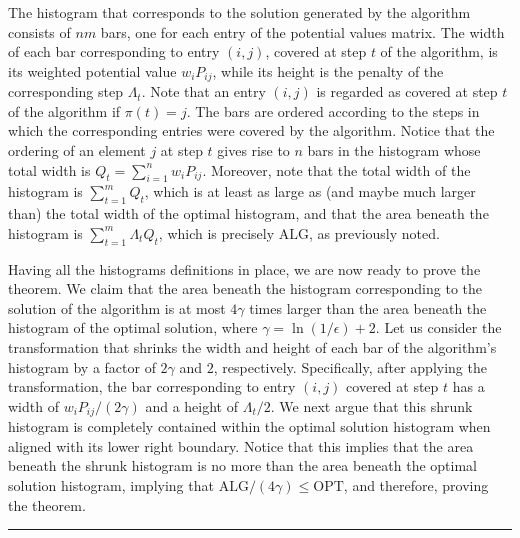 \documentclass[11pt]{article}
\theoremstyle{plain}
\theoremstyle{definition}
\newcommand{\qedsymb}{\hfill{\rule{2mm}{2mm}}}
\renewenvironment{proof}{\begin{trivlist} \item[\hspace{\labelsep}{\bf \noindent Proof.\/}] }{\qedsymb\end{trivlist}}\newenvironment{proofof}[1]{\begin{trivlist} \item[\hspace{\labelsep}{\bf \noindent Proof of #1.\/}] }{\qedsymb\end{trivlist}}\newenvironment{MyEqn}[1]{\setlength\arraycolsep{2pt}\begin{eqnarray*} #1}{\end{eqnarray*}}
\newcommand{\opt}{\mathrm{OPT}}
\newcommand{\alg}{\mathrm{ALG}}
\begin{document}
\begin{proof}
 The
histogram that corresponds to the solution generated by the
algorithm consists of $nm$ bars, one for each entry of the
potential values matrix. The width of each bar corresponding to
entry $(i,j)$, covered at step $t$ of the algorithm, is its
weighted potential value $w_i P_{ij}$, while its height is the
penalty of the corresponding step $\Lambda_{t}$. Note that an
entry $(i,j)$ is regarded as covered at step $t$ of the algorithm
if $\pi(t) = j$. The bars are ordered according to the steps in
which the corresponding entries were covered by the algorithm.
Notice that the ordering of an element $j$ at step $t$ gives rise
to $n$ bars in the histogram whose total width is $Q_t =
\sum_{i=1}^{n} w_i P_{ij}$. Moreover, note that the total width of
the histogram is $\sum_{t=1}^m Q_t$, which is at least as large as
(and maybe much larger than) the total width of the optimal
histogram, and that the area beneath the histogram is
$\sum_{t=1}^m \Lambda_{t} Q_t$, which is precisely $\alg$, as
previously noted.

\medskip Having all the histograms definitions in place,
we are now ready to prove the theorem. We claim that the area
beneath the histogram corresponding to the solution of the
algorithm is at most $4\gamma$ times larger than the area beneath
the histogram of the optimal solution, where $\gamma = \ln(1 /
\epsilon) + 2$. Let us consider the transformation that shrinks
the width and height of each bar of the algorithm's histogram by a
factor of $2\gamma$ and $2$, respectively. Specifically, after
applying the transformation, the bar corresponding to entry
$(i,j)$ covered at step $t$ has a width of $w_i P_{ij} /
(2\gamma)$ and a height of $\Lambda_{t} / 2$. We next argue that
this shrunk histogram is completely contained within the optimal
solution histogram when aligned with its lower right boundary.
Notice that this implies that the area beneath the shrunk
histogram is no more than the area beneath the optimal solution
histogram, implying that $\alg / (4\gamma) \leq \opt$, and
therefore, proving the theorem.


\end{proof}
\end{document}
